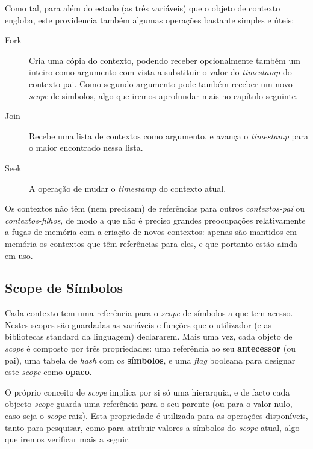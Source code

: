  Como tal, para além do estado (as três variáveis) que o objeto de contexto engloba, este providencia também algumas operações bastante simples e úteis:
 
 \begin{description}
  \item[Fork] Cria uma cópia do contexto, podendo receber opcionalmente também um inteiro como argumento com vista a substituir o valor do \textit{timestamp} do contexto pai. Como segundo argumento pode também receber um novo \textit{scope} de símbolos, algo que iremos aprofundar mais no capítulo seguinte.
  \item[Join] Recebe uma lista de contextos como argumento, e avança o \textit{timestamp} para o maior encontrado nessa lista.
  \item[Seek] A operação de mudar o \textit{timestamp} do contexto atual.
 \end{description}

 Os contextos não têm (nem precisam) de referências para outros \textit{contextos-pai} ou \textit{contextos-filhos}, de modo a que não é preciso grandes preocupações relativamente a fugas de memória com a criação de novos contextos: apenas são mantidos em memória os contextos que têm referências para eles, e que portanto estão ainda em uso.

\subsection{Scope de Símbolos}
Cada contexto tem uma referência para o \textit{scope} de símbolos a que tem acesso. Nestes scopes são guardadas as variáveis e funções que o utilizador (e as bibliotecas standard da linguagem) declararem. Mais uma vez, cada objeto de \textit{scope} é composto por três propriedades: uma referência ao seu \textbf{antecessor} (ou pai), uma tabela de \textit{hash} com os \textbf{símbolos}, e uma \textit{flag} booleana para designar este \textit{scope} como \textbf{opaco}.

O próprio conceito de \textit{scope} implica por si só uma hierarquia, e de facto cada objecto \textit{scope} guarda uma referência para o seu parente (ou para o valor nulo, caso seja o \textit{scope} raiz). Esta propriedade é utilizada para as operações disponíveis, tanto para pesquisar, como para atribuir valores a símbolos do \textit{scope} atual, algo que iremos verificar mais a seguir.

